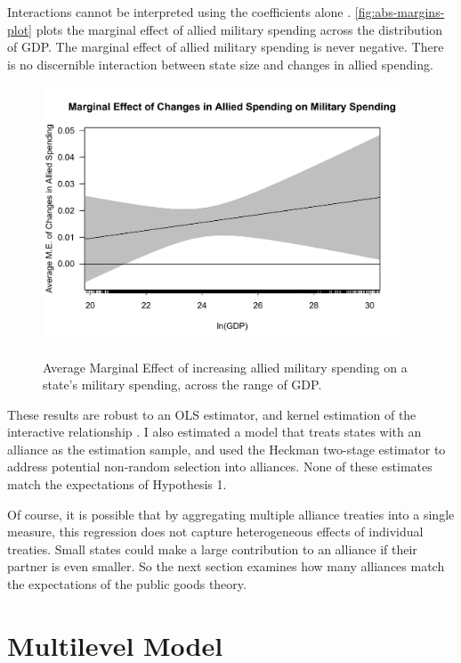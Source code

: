 \documentclass[12pt]{article}
\begin{document}
Interactions cannot be interpreted using the coefficients alone \citep{BramborClarkGolder2006}. 
\autoref{fig:abs-margins-plot} plots the marginal effect of allied military spending across the distribution of GDP. 
The marginal effect of allied military spending is never negative. 
There is no discernible interaction between state size and changes in allied spending. 

\begin{figure}
	\centering
		\includegraphics[width=0.95\textwidth]{abs-margins-plot.pdf}
	\label{fig:abs-margins-plot}
	\caption{Average Marginal Effect of increasing allied military spending on a state's military spending, across the range of GDP.}
\end{figure}


These results are robust to an OLS estimator, and kernel estimation of the interactive relationship \citep{Hainmuelleretal2017}. 
I also estimated a model that treats states with an alliance as the estimation sample, and used the Heckman two-stage estimator to address potential non-random selection into alliances. 
None of these estimates match the expectations of Hypothesis 1. 


Of course, it is possible that by aggregating multiple alliance treaties into a single measure, this regression does not capture heterogeneous effects of individual treaties.
Small states could make a large contribution to an alliance if their partner is even smaller. 
So the next section examines how many alliances match the expectations of the public goods theory. 


\section{Multilevel Model}
\end{document}
